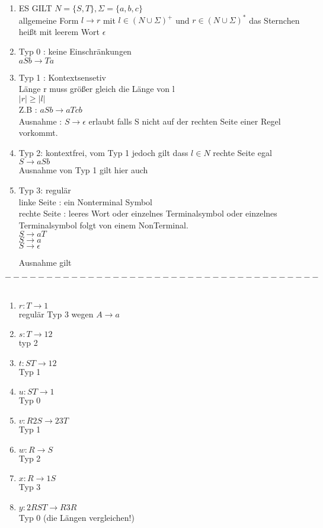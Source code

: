 \documentclass[12pt]{article}
\begin{document}
\begin{enumerate}
\item ES GILT $ N = \{S,T\} , \Sigma =\{a,b,c\}$ \\ 
allgemeine Form $l \to r$ mit $l \in (N \cup \Sigma)^+$ und $r \in (N \cup \Sigma)^* $ das Sternchen heißt mit leerem Wort $\epsilon$
\item   Typ 0 : keine Einschränkungen \\
$aSb \to Ta$

\item   Typ 1 : Kontextsensetiv \\
Länge r muss größer gleich die Länge von l\\
$|r| \geq |l|$\\
Z.B : $aSb \to aTcb$\\
Ausnahme : $S \to \epsilon$ erlaubt falls S nicht auf der rechten Seite einer Regel vorkommt.
\item   Typ 2: kontextfrei, vom Typ 1 jedoch gilt dass $l \in N$ rechte Seite egal \\
    $S \rightarrow aSb$\\
    Ausnahme von Typ 1 gilt hier auch
\item Typ 3: regulär \\ linke Seite : ein Nonterminal Symbol \\ rechte Seite : leeres Wort oder einzelnes Terminalsymbol oder einzelnes Terminalsymbol folgt von einem NonTerminal.\\
$S \to aT$\\
$S \to a$\\
$S \to \epsilon$

     Ausnahme gilt
     
\end{enumerate}
$--------------------------------------$\\ \\

     
 \begin{enumerate} 
 \item $r: T \rightarrow 1$ \\ regulär Typ 3 wegen $A \rightarrow a$
 \item $s: T \rightarrow 12$ \\ typ 2 
 \item $t: ST \rightarrow 12$\\  Typ 1
 \item $u: ST \rightarrow 1$ \\ Typ 0 
 \item $v: R2S \rightarrow 23T$ \\  Typ 1
 \item $w: R \rightarrow S$\\ Typ 2
 \item $x: R \rightarrow 1S$ \\ Typ 3
 \item $y: 2RST \rightarrow R3R$ \\  Typ 0 (die Längen vergleichen!)
 \end{enumerate} 
  
\end{document}
